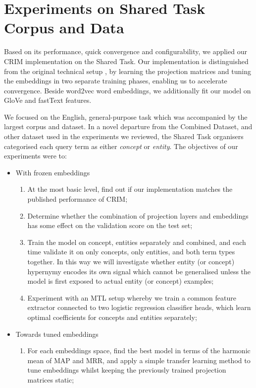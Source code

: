 \section{Experiments on Shared Task Corpus and Data}
Based on its performance, quick convergence and configurability, we applied our CRIM implementation on the Shared Task.  Our implementation is distinguished from the original technical setup \citep{bernier2018crim}, by learning the projection matrices and tuning the embeddings in two separate training phases, enabling us to accelerate convergence.  Beside word2vec word embeddings, we additionally fit our model on GloVe and fastText features.

We focused on the English, general-purpose task which was accompanied by the largest corpus and dataset.  In a novel departure from the Combined Dataset, and other dataset used in the experiments we reviewed, the Shared Task organisers categorised each query term as either \textit{concept} or \textit{entity}.  The objectives of our experiments were to:
\begin{itemize}
    \item With frozen embeddings
    \begin{enumerate}
        \item At the most basic level, find out if our implementation matches the published performance of CRIM;
        \item Determine whether the combination of projection layers and embeddings has some effect on the validation score on the test set;
        \item Train the model on concept, entities separately and combined, and each time validate it on only concepts, only entities, and both term types together.  In this way we will investigate whether entity (or concept) hypernymy encodes its own signal which cannot be generalised unless the model is first exposed to actual entity (or concept) examples;
        \item Experiment with an \ac{MTL} setup whereby we train a common feature extractor connected to two logistic regression classifier heads, which learn optimal coefficients for concepts and entities separately;
    \end{enumerate}
    \item Towards tuned embeddings
    \begin{enumerate}
        \item For each embeddings space, find the best model in terms of the harmonic mean of \ac{MAP} and \ac{MRR}, and apply a simple transfer learning method to tune embeddings whilst keeping the previously trained projection matrices static;
    \end{enumerate}
\end{itemize}

